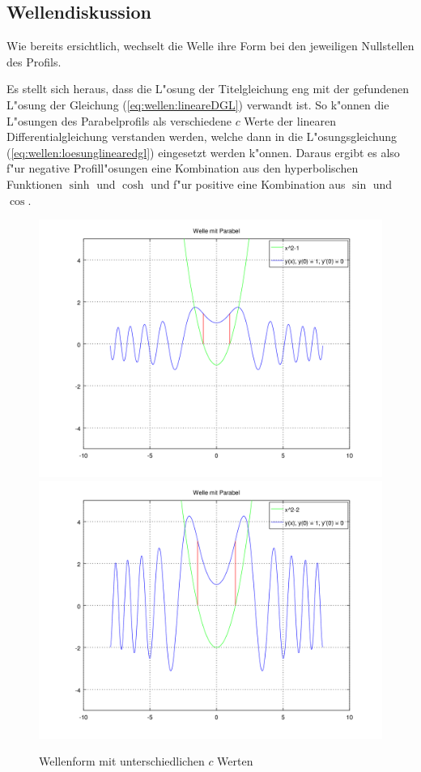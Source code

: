 \subsection{Wellendiskussion}
\label{sec:wellen:diskussionwellenform}

Wie bereits ersichtlich, wechselt die Welle ihre Form bei den jeweiligen 
Nullstellen des Profils.

Es stellt sich heraus, dass die L"osung der Titelgleichung eng mit der 
gefundenen L"osung der Gleichung (\ref{eq:wellen:lineareDGL}) verwandt ist. So 
k"onnen die L"osungen des Parabelprofils als verschiedene $c$ Werte der 
linearen Differentialgleichung verstanden werden, welche dann in die 
L"osungsgleichung (\ref{eq:wellen:loesunglinearedgl}) eingesetzt werden 
k"onnen. Daraus ergibt es also f"ur negative Profill"osungen eine Kombination 
aus den hyperbolischen Funktionen $\sinh$ und $\cosh$ und f"ur positive eine 
Kombination aus $\sin$ und $\cos$.

\begin{figure}
	\includegraphics[scale=0.35]{./wellen/images/varc/cneg1.png}
	\includegraphics[scale=0.35]{./wellen/images/varc/cneg2.png}
	\caption{Wellenform mit unterschiedlichen $c$ Werten}
	\label{fig:wellen:variablec}
\end{figure}

